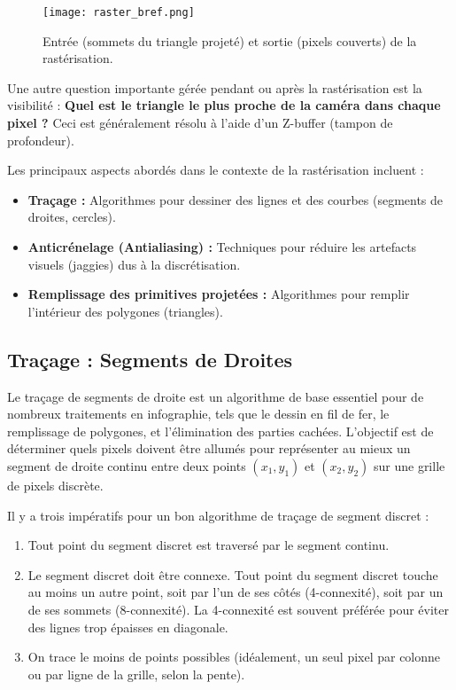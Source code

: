 \documentclass{article}
\begin{document}
\begin{figure}[H]
\centering
\texttt{[image: raster\_bref.png]}
\caption{Entrée (sommets du triangle projeté) et sortie (pixels couverts) de la rastérisation.}
\label{fig:raster_bref}
\end{figure}

Une autre question importante gérée pendant ou après la rastérisation est la visibilité : \textbf{Quel est le triangle le plus proche de la caméra dans chaque pixel ?} Ceci est généralement résolu à l'aide d'un Z-buffer (tampon de profondeur).

Les principaux aspects abordés dans le contexte de la rastérisation incluent :
\begin{itemize}
    \item \textbf{Traçage :} Algorithmes pour dessiner des lignes et des courbes (segments de droites, cercles).
    \item \textbf{Anticrénelage (Antialiasing) :} Techniques pour réduire les artefacts visuels (jaggies) dus à la discrétisation.
    \item \textbf{Remplissage des primitives projetées :} Algorithmes pour remplir l'intérieur des polygones (triangles).
\end{itemize}

\subsection{Traçage : Segments de Droites}
Le traçage de segments de droite est un algorithme de base essentiel pour de nombreux traitements en infographie, tels que le dessin en fil de fer, le remplissage de polygones, et l'élimination des parties cachées. L'objectif est de déterminer quels pixels doivent être allumés pour représenter au mieux un segment de droite continu entre deux points $(x_1, y_1)$ et $(x_2, y_2)$ sur une grille de pixels discrète.

Il y a trois impératifs pour un bon algorithme de traçage de segment discret :
\begin{enumerate}
    \item Tout point du segment discret est traversé par le segment continu.
    \item Le segment discret doit être connexe. Tout point du segment discret touche au moins un autre point, soit par l'un de ses côtés (4-connexité), soit par un de ses sommets (8-connexité). La 4-connexité est souvent préférée pour éviter des lignes trop épaisses en diagonale.
    \item On trace le moins de points possibles (idéalement, un seul pixel par colonne ou par ligne de la grille, selon la pente).
\end{enumerate}
\end{document}

